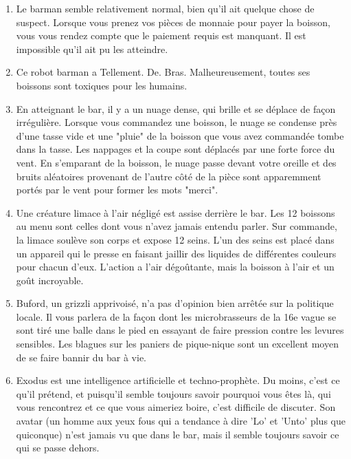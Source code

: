 \documentclass{article}
\begin{document}
\begin{enumerate}
	\item Le barman semble relativement normal, bien qu'il ait quelque chose de suspect. Lorsque vous prenez vos pièces de monnaie pour payer la boisson, vous vous rendez compte que le paiement requis est manquant. Il est impossible qu'il ait pu les atteindre.
	\item Ce robot barman a Tellement. De. Bras. Malheureusement, toutes ses boissons sont toxiques pour les humains.
	\item En atteignant le bar, il y a un nuage dense, qui brille et se déplace de façon irrégulière. Lorsque vous commandez une boisson, le nuage se condense près d'une tasse vide et une "pluie" de la boisson que vous avez commandée tombe dans la tasse. Les nappages et la coupe sont déplacés par une forte force du vent. En s'emparant de la boisson, le nuage passe devant votre oreille et des bruits aléatoires provenant de l'autre côté de la pièce sont apparemment portés par le vent pour former les mots "merci".
	\item Une créature limace à l'air négligé est assise derrière le bar. Les 12 boissons au menu sont celles dont vous n'avez jamais entendu parler. Sur commande, la limace soulève son corps et expose 12 seins. L'un des seins est placé dans un appareil qui le presse en faisant jaillir des liquides de différentes couleurs pour chacun d'eux. L'action a l'air dégoûtante, mais la boisson à l'air et un goût incroyable.
	\item Buford, un grizzli apprivoisé, n'a pas d'opinion bien arrêtée sur la politique locale. Il vous parlera de la façon dont les microbrasseurs de la 16e vague se sont tiré une balle dans le pied en essayant de faire pression contre les levures sensibles. Les blagues sur les paniers de pique-nique sont un excellent moyen de se faire bannir du bar à vie.
	\item Exodus est une intelligence artificielle et techno-prophète. Du moins, c'est ce qu'il prétend, et puisqu'il semble toujours savoir pourquoi vous êtes là, qui vous rencontrez et ce que vous aimeriez boire, c'est difficile de discuter. Son avatar (un homme aux yeux fous qui a tendance à dire 'Lo' et 'Unto' plus que quiconque) n'est jamais vu que dans le bar, mais il semble toujours savoir ce qui se passe dehors.

\end{enumerate}
\end{document}
